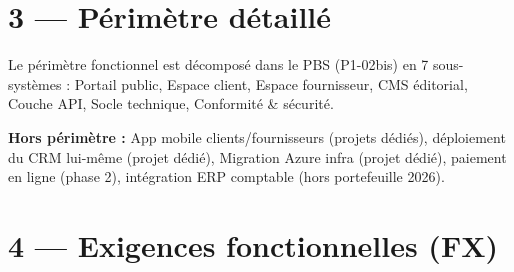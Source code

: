 \documentclass[11pt,a4paper,oneside]{report}
\begin{document}
\section*{3 --- Périmètre détaillé}

Le périmètre fonctionnel est décomposé dans le PBS (P1-02bis) en 7 sous-systèmes : Portail public, Espace client, Espace fournisseur, CMS éditorial, Couche API, Socle technique, Conformité \& sécurité.

\textbf{Hors périmètre :} App mobile clients/fournisseurs (projets dédiés), déploiement du CRM lui-même (projet dédié), Migration Azure infra (projet dédié), paiement en ligne (phase 2), intégration ERP comptable (hors portefeuille 2026).

\section*{4 --- Exigences fonctionnelles (FX)}
\end{document}
